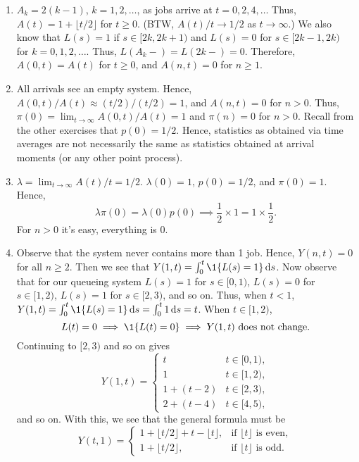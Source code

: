 \documentclass[stochastic-or.tex]{subfiles}
\begin{document}
\begin{exercise}
\begin{solution}
\begin{enumerate}
\item $A_{k} = 2(k-1)$, $k=1, 2, \ldots$, as jobs arrive at $t=0, 2, 4, \ldots$ Thus, $A(t) = 1 + \lfloor t/2 \rfloor$ for $t \geq 0$.
(BTW, $A(t)/t \to 1/2$ as $t\to \infty$.)
We also know that $L(s)=1$ if $s\in [2k, 2k+1)$ and $L(s)=0$ for $s\in[2k-1, 2k)$ for $k=0, 1, 2, \ldots$.
Thus, $L(A_k-) = L(2k-)=0$.
Therefore, $A(0,t) = A(t)$ for $t \geq 0$, and $A(n,t)=0$ for $n\geq 1$.
\item All arrivals see an empty system.
  Hence, $A(0,t)/A(t) \approx (t/2)/(t/2) = 1$, and $A(n,t)=0$ for $n>0$.
  Thus, $\pi(0) = \lim_{t\to\infty} A(0,t)/A(t) = 1$ and $\pi(n)=0$ for $n>0$.
  Recall from the other exercises that $p(0)=1/2$.
  Hence, statistics as obtained via time averages are not necessarily the same as statistics obtained at arrival moments (or any other point process).
  \item $\lambda = \lim_{t\to\infty} A(t)/t = 1/2$. $\lambda(0)=1$, $p(0)=1/2$, and $\pi(0)=1$. Hence,
\begin{equation*}
 \lambda \pi(0) = \lambda(0) p(0) \implies \frac 1 2 \times 1 = 1\times \frac 1 2.
\end{equation*}
For $n>0$ it's easy, everything is 0.
\item
Observe that the system never contains
 more than 1 job. Hence, $Y(n,t)=0$ for all $n\geq 2$. Then we see that
 $Y(1,t) = \int_0^t \1{\L(s) = 1}\d s$. Now observe that for our
 queueing system $L(s)=1$ for $s\in[0,1)$, $L(s)=0$ for
 $s\in[1,2)$, $L(s)=1$ for $s\in[2,3)$, and so on. Thus, when
 $t<1$, $Y(1,t)=\int_0^t \1{\L(s)=1} \d s = \int_0^t 1\d s = t$.
 When $t\in[1,2)$,
 \begin{equation*}
 L(t)=0 \implies \1{\L(t)=0} \implies Y(1,t) \text{ does not change}.
 \end{equation*}
Continuing to $[2,3)$ and so on gives
 \begin{equation*}
 Y(1,t) =
 \begin{cases}
 t & t\in[0,1), \\
 1 & t\in[1,2), \\
 1+(t-2) & t\in[2,3), \\
 2+(t-4) & t\in[4,5),
 \end{cases}
 \end{equation*}
 and so on. With this, we see that the general formula must be
 \begin{equation*}
Y(t,1) =
 \begin{cases}
1+ \lfloor t/2\rfloor +   t-\lfloor t \rfloor, &\text{if } \lfloor t \rfloor \text{ is even}, \\
1+ \lfloor t/2\rfloor, &\text{if } \lfloor t \rfloor \text{ is odd}.
 \end{cases}
 \end{equation*}


\end{enumerate}
\end{solution}
\end{exercise}
\end{document}
